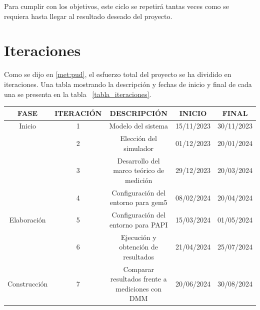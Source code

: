 Para cumplir con los objetivos, este ciclo se repetirá tantas veces como se requiera hasta llegar al resultado deseado del proyecto.

\section{Iteraciones}

Como se dijo en \ref{met:pud}, el esfuerzo total del proyecto se ha dividido en iteraciones. Una tabla mostrando la descripción y fechas de inicio y final de cada una se presenta en la tabla ~\ref{tabla_iteraciones}. 

\begin{table}[H]
    \centering
    \resizebox{15.5cm}{!} {
        \begin{tabular}{|c|c|c|c|c|}
        \hline
        \rowcolor[HTML]{C0C0C0} 
        \cellcolor[HTML]{C0C0C0}\textbf{FASE}                 & \textbf{ITERACIÓN}        & \textbf{DESCRIPCIÓN}                                             & \textbf{INICIO} & \textbf{FINAL} \\ \hline
        \cellcolor[HTML]{FFFFFF}Inicio                        & \cellcolor[HTML]{FFFFFF}1 & \cellcolor[HTML]{FFFFFF}Modelo del sistema                       & 15/11/2023      & 30/11/2023     \\ \hline
        \cellcolor[HTML]{FFFFFF}                              & \cellcolor[HTML]{FFFFFF}2 & \cellcolor[HTML]{FFFFFF}Elección del simulador                   & 01/12/2023      & 20/01/2024     \\ \cline{2-5} 
        \cellcolor[HTML]{FFFFFF}                              & \cellcolor[HTML]{FFFFFF}3 & \cellcolor[HTML]{FFFFFF}Desarrollo del marco teórico de medición & 29/12/2023      & 20/03/2024     \\ \cline{2-5} 
        \cellcolor[HTML]{FFFFFF}                              & \cellcolor[HTML]{FFFFFF}4 & Configuración del entorno para gem5                              & 08/02/2024      & 20/04/2024     \\ \cline{2-5} 
        \multirow{-4}{*}{\cellcolor[HTML]{FFFFFF}Elaboración} & 5                         & Configuración del entorno para PAPI                              & 15/03/2024      & 01/05/2024     \\ \hline
                                                              & 6                         & Ejecución y obtención de resultados                              & 21/04/2024      & 25/07/2024     \\ \cline{2-5} 
        \multirow{-2}{*}{Construcción}                        & 7                         & Comparar resultados frente a mediciones con DMM                  & 20/06/2024      & 30/08/2024     \\ \hline

\end{tabular}}
\end{table}
